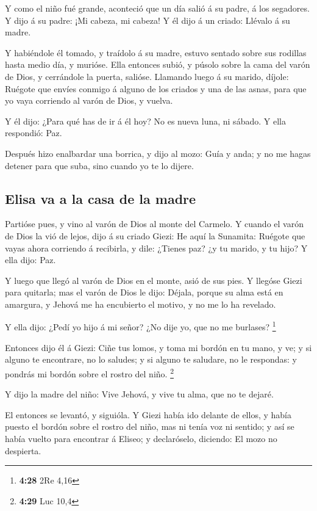  Y como el niño fué grande, aconteció que un día salió á su
padre, á los segadores.  Y dijo á su padre: ¡Mi cabeza, mi
cabeza! Y él dijo á un criado: Llévalo á su madre.

 Y habiéndole él tomado, y traídolo á su madre, estuvo
sentado sobre sus rodillas hasta medio día, y murióse. 
Ella entonces subió, y púsolo sobre la cama del varón de Dios, y
cerrándole la puerta, salióse.  Llamando luego á su marido,
díjole: Ruégote que envíes conmigo á alguno de los criados y una de las
asnas, para que yo vaya corriendo al varón de Dios, y vuelva.

 Y él dijo: ¿Para qué has de ir á él hoy? No es nueva luna,
ni sábado. Y ella respondió: Paz.

 Después hizo enalbardar una borrica, y dijo al mozo: Guía
y anda; y no me hagas detener para que suba, sino cuando yo te lo
dijere.

\hypertarget{elisa-va-a-la-casa-de-la-madre}{%
\subsection{Elisa va a la casa de la
madre}\label{elisa-va-a-la-casa-de-la-madre}}

 Partióse pues, y vino al varón de Dios al monte del
Carmelo. Y cuando el varón de Dios la vió de lejos, dijo á su criado
Giezi: He aquí la Sunamita:  Ruégote que vayas ahora
corriendo á recibirla, y dile: ¿Tienes paz? ¿y tu marido, y tu hijo? Y
ella dijo: Paz.

 Y luego que llegó al varón de Dios en el monte, asió de
sus pies. Y llegóse Giezi para quitarla; mas el varón de Dios le dijo:
Déjala, porque su alma está en amargura, y Jehová me ha encubierto el
motivo, y no me lo ha revelado.

 Y ella dijo: ¿Pedí yo hijo á mi señor? ¿No dije yo, que no
me burlases? \footnote{\textbf{4:28} 2Re 4,16}

 Entonces dijo él á Giezi: Ciñe tus lomos, y toma mi bordón
en tu mano, y ve; y si alguno te encontrare, no lo saludes; y si alguno
te saludare, no le respondas: y pondrás mi bordón sobre el rostro del
niño. \footnote{\textbf{4:29} Luc 10,4}

 Y dijo la madre del niño: Vive Jehová, y vive tu alma, que
no te dejaré.

 El entonces se levantó, y siguióla. Y Giezi había ido
delante de ellos, y había puesto el bordón sobre el rostro del niño, mas
ni tenía voz ni sentido; y así se había vuelto para encontrar á Eliseo;
y declaróselo, diciendo: El mozo no despierta.

